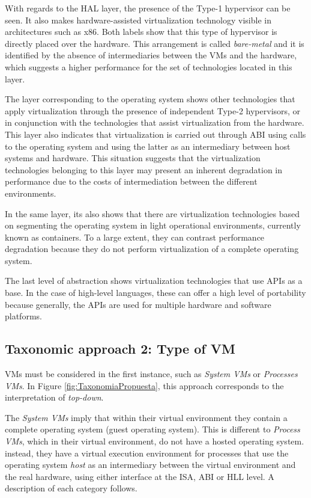 	With regards to the HAL layer, the presence of the Type-1 hypervisor can be seen. It also makes hardware-assisted virtualization technology visible in architectures such as x86. Both labels show that this type of hypervisor is directly placed over the hardware.  This arrangement is called \textit{bare-metal} and it is identified by the absence of intermediaries between the VMs and the hardware, which suggests a higher performance for the set of technologies located in this layer.
	
	The layer corresponding to the operating system shows other technologies that apply virtualization through the presence of independent Type-2 hypervisors, or in conjunction with the technologies that assist virtualization from the hardware. This layer also indicates that virtualization is carried out through ABI using calls to the operating system and using the latter as an intermediary between host systems and hardware. This situation suggests that the virtualization technologies belonging to this layer may present an inherent degradation in performance due to the costs of intermediation between the different environments.
	
	In the same layer, its also shows that there are virtualization technologies based on segmenting the operating system in light operational environments, currently known as containers. To a large extent, they can contrast performance degradation because they do not perform virtualization of a complete operating system.
	
	The last level of abstraction shows virtualization technologies that use APIs as a base. In the case of high-level languages, these can offer a high level of portability because generally, the APIs are used for multiple hardware and software platforms.
	
	\subsection{Taxonomic approach 2: Type of VM}
	
	VMs must be considered in the first instance, such as \textit{System VMs} or \textit{ Processes VMs}. In Figure \ref{fig:TaxonomiaPropuesta}, this approach corresponds to the interpretation of \textit{top-down}.
	
	The \textit{System VMs} imply that within their virtual environment they contain a complete operating system (guest operating system). This is different to \textit{Process VMs}, which in their virtual environment, do not have a hosted operating system. instead, they have a virtual execution environment for processes that use the operating system \textit{host} as an intermediary between the virtual environment and the real hardware, using either interface at the ISA, ABI or HLL level. A description of each category follows.
	
